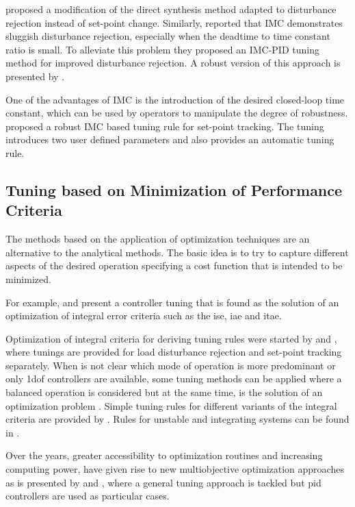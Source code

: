 \citet{chenseborg2002} proposed a modification of the direct synthesis method adapted to disturbance rejection instead of set-point change. Similarly, \citet{shamsu2008} reported that IMC demonstrates sluggish disturbance rejection, especially when the deadtime to time constant ratio is small. To alleviate this problem they proposed an IMC-PID tuning method for improved disturbance rejection. A robust version of this approach is presented by \citet{Vilanova2018}.

One of the advantages of IMC is the introduction of the desired closed-loop time constant, which can be used by operators to manipulate the degree of robustness. \citet{vilanovaJPC2008} proposed a robust IMC based tuning rule for set-point tracking. The tuning introduces two user defined parameters and also provides an automatic tuning rule. 
%
\subsection{Tuning based on Minimization of Performance Criteria}
%
The methods based on the application of optimization techniques are an alternative to the analytical methods. The basic idea is to try to capture different aspects of the desired operation specifying a cost function that is intended to be minimized.

For example, \citet{corripio2001} and \citet{shinskey.1994} present a controller tuning that is found as the solution of an optimization of integral error criteria such as the \gls{ise}, \gls{iae} and \gls{itae}.

Optimization of integral criteria for deriving tuning rules were started by \citet{lopez1967} and \citet{Rovira1969a}, where tunings are provided for load disturbance rejection and set-point tracking separately. When is not clear which mode of operation is more predominant or only \gls{1dof} controllers are available, some tuning methods can be applied where a balanced operation is considered but at the same time, is the solution of an optimization problem \citep{Arrieta2010}. Simple tuning rules for different variants of the integral criteria are provided by \citet{zhuang1993}. Rules for unstable and integrating systems can be found in \citet{visioli2001}.

Over the years, greater accessibility to optimization routines and increasing computing power, have given rise to new multiobjective optimization approaches as is presented by \citet{herreros2002}  and \citet{toivonen2006}, where a general tuning approach is tackled but \gls{pid} controllers are used as particular cases.

